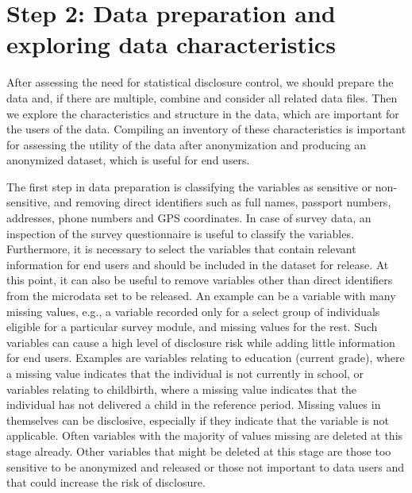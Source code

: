 \documentclass[letterpaper,10pt,english]{sphinxmanual}
\begin{document}
\section{Step 2: Data preparation and exploring data characteristics}
\label{\detokenize{process:step-2-data-preparation-and-exploring-data-characteristics}}
After assessing the need for statistical disclosure control, we should
prepare the data and, if there are multiple, combine and consider all
related data files. Then we explore the characteristics and structure in
the data, which are important for the users of the data. Compiling an
inventory of these characteristics is important for assessing the
utility of the data after anonymization and producing an anonymized
dataset, which is useful for end users.

The first step in data preparation is classifying the variables as
sensitive or non-sensitive, and removing direct identifiers such as full
names, passport numbers, addresses, phone numbers and GPS coordinates.
In case of survey data, an inspection of the survey questionnaire is
useful to classify the variables. Furthermore, it is necessary to select
the variables that contain relevant information for end users and should
be included in the dataset for release. At this point, it can also be
useful to remove variables other than direct identifiers from the
microdata set to be released. An example can be a variable with many
missing values, e.g., a variable recorded only for a select group of
individuals eligible for a particular survey module, and missing values
for the rest. Such variables can cause a high level of disclosure risk
while adding little information for end users. Examples are variables
relating to education (current grade), where a missing value indicates
that the individual is not currently in school, or variables relating to
childbirth, where a missing value indicates that the individual has not
delivered a child in the reference period. Missing values in themselves
can be disclosive, especially if they indicate that the variable is not
applicable. Often variables with the majority of values missing are
deleted at this stage already. Other variables that might be deleted at
this stage are those too sensitive to be anonymized and released or
those not important to data users and that could increase the risk of
disclosure.
\end{document}
